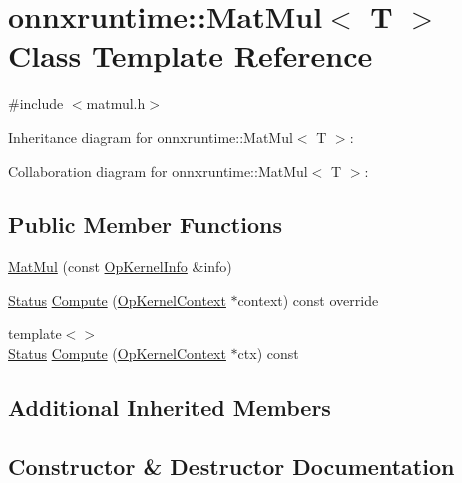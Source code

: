 \hypertarget{classonnxruntime_1_1MatMul}{}\section{onnxruntime\+:\+:Mat\+Mul$<$ T $>$ Class Template Reference}
\label{classonnxruntime_1_1MatMul}


{\ttfamily \#include $<$matmul.\+h$>$}



Inheritance diagram for onnxruntime\+:\+:Mat\+Mul$<$ T $>$\+:


Collaboration diagram for onnxruntime\+:\+:Mat\+Mul$<$ T $>$\+:
\subsection*{Public Member Functions}
\begin{DoxyCompactItemize}
\item 
\mbox{\hyperlink{classonnxruntime_1_1MatMul_ac73d8ec0fd021eb797a5eaeac3cde049}{Mat\+Mul}} (const \mbox{\hyperlink{classonnxruntime_1_1OpKernelInfo}{Op\+Kernel\+Info}} \&info)
\item 
\mbox{\hyperlink{classonnxruntime_1_1common_1_1Status}{Status}} \mbox{\hyperlink{classonnxruntime_1_1MatMul_acec8f431deefacc14e73a10878edb52c}{Compute}} (\mbox{\hyperlink{classonnxruntime_1_1OpKernelContext}{Op\+Kernel\+Context}} $\ast$context) const override
\item 
{\footnotesize template$<$$>$ }\\\mbox{\hyperlink{classonnxruntime_1_1common_1_1Status}{Status}} \mbox{\hyperlink{classonnxruntime_1_1MatMul_a49146234469a640b16f571d07d325b9c}{Compute}} (\mbox{\hyperlink{classonnxruntime_1_1OpKernelContext}{Op\+Kernel\+Context}} $\ast$ctx) const
\end{DoxyCompactItemize}
\subsection*{Additional Inherited Members}


\subsection{Constructor \& Destructor Documentation}
\mbox{\label{classonnxruntime_1_1MatMul_ac73d8ec0fd021eb797a5eaeac3cde049}} 
